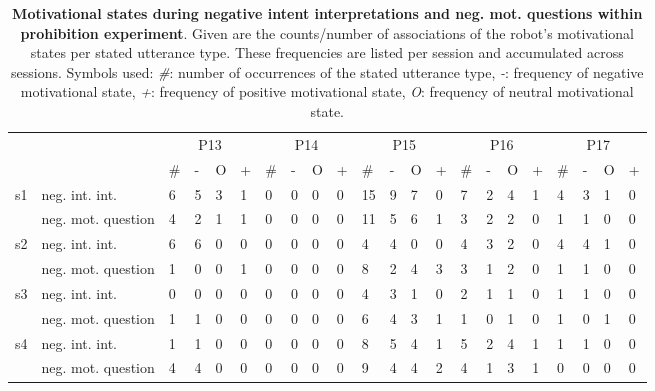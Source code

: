 \begin{table*}[h]
  \setlength{\tabcolsep}{0.95ex}
  \caption{\textbf{Motivational states during negative intent interpretations and neg. mot. questions within prohibition experiment}. 
    Given are the counts/number of associations of the robot's motivational states per stated utterance type. These frequencies are
    listed per session and accumulated across sessions. Symbols used: \emph{\#}: number of occurrences of the stated utterance type,
    \emph{-}: frequency of negative motivational state, \emph{+}: frequency of positive motivational state, \emph{O}: frequency of
    neutral motivational state.}
  \label{tbl:neg_int_int_mot2}
  \begin{small}
    \begin{tabular*}{\hsize}{@{\extracolsep{\fill}}llllllllllllllllllllll}
      \toprule
      &  & \multicolumn{4}{c}{P13} & \multicolumn{4}{c}{P14} & \multicolumn{4}{c}{P15} & \multicolumn{4}{c}{P16} & \multicolumn{4}{c}{P17}\\
      \cmidrule(lr){3-6}\cmidrule(lr){7-10}\cmidrule(lr){11-14}\cmidrule(lr){15-18}\cmidrule(lr){19-22}
      &  & \# & - & O & + & \# & - & O & + & \# & - & O & + & \# & - & O & + & \# & - & O & +\\
      \cmidrule(lr){3-6}\cmidrule(lr){7-10}\cmidrule(lr){11-14}\cmidrule(lr){15-18}\cmidrule(lr){19-22}
      \multirow{2}{*}{s1} & neg. int. int. & 6 & 5 & 3 & 1 & 0 & 0 & 0 & 0 & 15 & 9 & 7 & 0 & 7 & 2 & 4 & 1 & 4 & 3 & 1 & 0\\
      & neg. mot. question & 4 & 2 & 1 & 1 & 0 & 0 & 0 & 0 & 11 & 5 & 6 & 1 & 3 & 2 & 2 & 0 & 1 & 1 & 0 & 0\\
      \multirow{2}{*}{s2} & neg. int. int. & 6 & 6 & 0 & 0 & 0 & 0 & 0 & 0 & 4 & 4 & 0 & 0 & 4 & 3 & 2 & 0 & 4 & 4 & 1 & 0\\
      & neg. mot. question & 1 & 0 & 0 & 1 & 0 & 0 & 0 & 0 & 8 & 2 & 4 & 3 & 3 & 1 & 2 & 0 & 1 & 1 & 0 & 0\\
      \multirow{2}{*}{s3} & neg. int. int. & 0 & 0 & 0 & 0 & 0 & 0 & 0 & 0 & 4 & 3 & 1 & 0 & 2 & 1 & 1 & 0 & 1 & 1 & 0 & 0\\
      & neg. mot. question & 1 & 1 & 0 & 0 & 0 & 0 & 0 & 0 & 6 & 4 & 3 & 1 & 1 & 0 & 1 & 0 & 1 & 0 & 1 & 0\\
      \multirow{2}{*}{s4} & neg. int. int. & 1 & 1 & 0 & 0 & 0 & 0 & 0 & 0 & 8 & 5 & 4 & 1 & 5 & 2 & 4 & 1 & 1 & 1 & 0 & 0\\
      & neg. mot. question & 4 & 4 & 0 & 0 & 0 & 0 & 0 & 0 & 9 & 4 & 4 & 2 & 4 & 1 & 3 & 1 & 0 & 0 & 0 & 0\\

\end{tabular*}
\end{small}
\end{table*}

